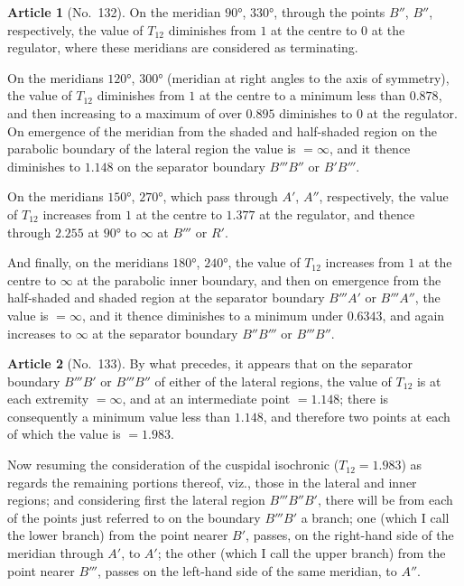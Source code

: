 \documentclass[11pt,a4paper]{article}
\theoremstyle{definition}
\newtheorem{art}{Article}
\begin{document}
\begin{art}[No.~132]
On the meridian $90°$, $330°$, through the points $B''$, $B''$, respectively, the value of $T_{12}$ diminishes from $1$ at the centre to $0$ at the regulator, where these meridians are considered as terminating.

On the meridians $120°$, $300°$ (meridian at right angles to the axis of symmetry), the value of $T_{12}$ diminishes from $1$ at the centre to a minimum less than $0.878$, and then increasing to a maximum of over $0.895$ diminishes to $0$ at the regulator. On emergence of the meridian from the shaded and half-shaded region on the parabolic boundary of the lateral region the value is $= \infty$, and it thence diminishes to $1.148$ on the separator boundary $B'''B''$ or $B'B'''$.

On the meridians $150°$, $270°$, which pass through $A'$, $A''$, respectively, the value of $T_{12}$ increases from $1$ at the centre to $1.377$ at the regulator, and thence through $2.255$ at $90°$ to $\infty$ at $B'''$ or $R'$.

And finally, on the meridians $180°$, $240°$, the value of $T_{12}$ increases from $1$ at the centre to $\infty$ at the parabolic inner boundary, and then on emergence from the half-shaded and shaded region at the separator boundary $B'''A'$ or $B'''A''$, the value is $= \infty$, and it thence diminishes to a minimum under $0.6343$, and again increases to $\infty$ at the separator boundary $B''B'''$ or $B'''B''$.
\end{art}

\begin{art}[No.~133]
By what precedes, it appears that on the separator boundary $B'''B'$ or $B'''B''$ of either of the lateral regions, the value of $T_{12}$ is at each extremity $= \infty$, and at an intermediate point $= 1.148$; there is consequently a minimum value less than $1.148$, and therefore two points at each of which the value is $= 1.983$.

Now resuming the consideration of the cuspidal isochronic ($T_{12} = 1.983$) as regards the remaining portions thereof, viz., those in the lateral and inner regions; and considering first the lateral region $B'''B''B'$, there will be from each of the points just referred to on the boundary $B'''B'$ a branch; one (which I call the lower branch) from the point nearer $B'$, passes, on the right-hand side of the meridian through $A'$, to $A'$; the other (which I call the upper branch) from the point nearer $B'''$, passes on the left-hand side of the same meridian, to $A''$.
\end{art}
\end{document}
